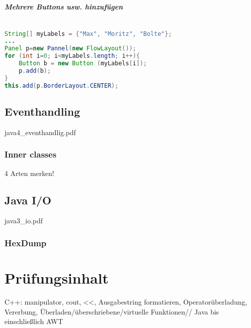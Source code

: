 \paragraph{Mehrere Buttons usw. hinzufügen} $ $
\begin{lstlisting}[language=Java]
String[] myLabels = {"Max", "Moritz", "Bolte"};
...
Panel p=new Pannel(new FlowLayout());
for (int i=0; i<myLabels.length; i++){
	Button b = new Button (myLabels[i]);
	p.add(b);
}
this.add(p.BorderLayout.CENTER);
\end{lstlisting}

\section{Eventhandling}
java4\_eventhandlig.pdf

\subsection{Inner classes}
4 Arten merken!

\section{Java I/O}
java3\_io.pdf

\subsection{HexDump}


\chapter{Prüfungsinhalt}
C++: manipulator, cout, <<, Ausgabestring formatieren, Operatorüberladung, Vererbung, Überladen/überschriebene/virtuelle Funktionen//
Java bis einschließlich AWT

\newpage
\printbibliography
